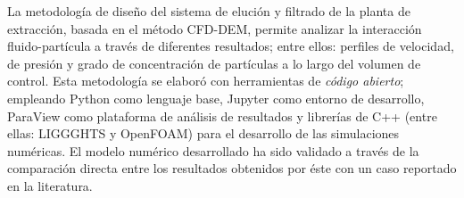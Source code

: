 La metodolog\'ia de dise\~no del sistema de eluci\'on y filtrado de la planta de extracci\'on, basada en el m\'etodo CFD-DEM, permite analizar la interacci\'on fluido-part\'icula a trav\'es de diferentes resultados; entre ellos: perfiles de velocidad, de presi\'on y grado de concentraci\'on de part\'iculas a lo largo del volumen de control. Esta metodolog\'ia se elabor\'o con herramientas de \textit{c\'odigo abierto}; empleando Python como lenguaje base, Jupyter como entorno de desarrollo, ParaView como plataforma de an\'alisis de resultados y librer\'ias de C++ (entre ellas: LIGGGHTS y OpenFOAM) para el desarrollo de las simulaciones num\'ericas. El modelo num\'erico desarrollado ha sido validado a trav\'es de la comparaci\'on directa entre los resultados obtenidos por \'este con un caso reportado en la literatura.

\newpage

